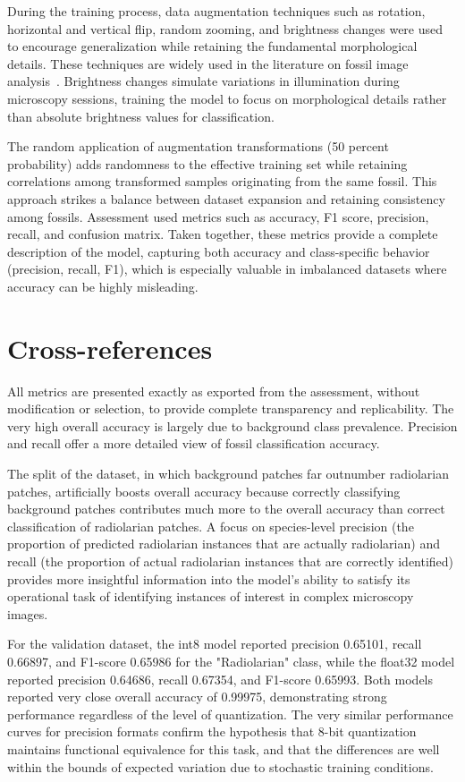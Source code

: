 \documentclass[a4paper,fleqn]{cas-sc}
\begin{document}
During the training process, data augmentation techniques such as rotation, horizontal and vertical flip, random zooming, and brightness changes were used to encourage generalization while retaining the fundamental morphological details. These techniques are widely used in the literature on fossil image analysis~\cite{li2022morphology}. Brightness changes simulate variations in illumination during microscopy sessions, training the model to focus on morphological details rather than absolute brightness values for classification.

The random application of augmentation transformations (50 percent probability) adds randomness to the effective training set while retaining correlations among transformed samples originating from the same fossil. This approach strikes a balance between dataset expansion and retaining consistency among fossils. Assessment used metrics such as accuracy, F1 score, precision, recall, and confusion matrix. Taken together, these metrics provide a complete description of the model, capturing both accuracy and class-specific behavior (precision, recall, F1), which is especially valuable in imbalanced datasets where accuracy can be highly misleading.

\FloatBarrier

\section{Cross-references}

All metrics are presented exactly as exported from the assessment, without modification or selection, to provide complete transparency and replicability. The very high overall accuracy is largely due to background class prevalence. Precision and recall offer a more detailed view of fossil classification accuracy.

The split of the dataset, in which background patches far outnumber radiolarian patches, artificially boosts overall accuracy because correctly classifying background patches contributes much more to the overall accuracy than correct classification of radiolarian patches. A focus on species-level precision (the proportion of predicted radiolarian instances that are actually radiolarian) and recall (the proportion of actual radiolarian instances that are correctly identified) provides more insightful information into the model's ability to satisfy its operational task of identifying instances of interest in complex microscopy images.

For the validation dataset, the int8 model reported precision 0.65101, recall 0.66897, and F1-score 0.65986 for the "Radiolarian" class, while the float32 model reported precision 0.64686, recall 0.67354, and F1-score 0.65993. Both models reported very close overall accuracy of 0.99975, demonstrating strong performance regardless of the level of quantization. The very similar performance curves for precision formats confirm the hypothesis that 8-bit quantization maintains functional equivalence for this task, and that the differences are well within the bounds of expected variation due to stochastic training conditions.
\end{document}
